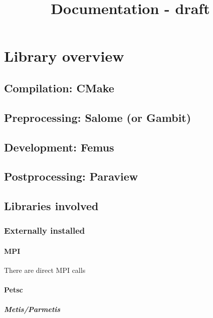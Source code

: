 \documentclass[10pt]{book}
\title{Documentation - draft}
\author{}
\date{}
\begin{document}
\maketitle

 \setcounter{tocdepth}{4}
\setcounter{secnumdepth}{4}
\tableofcontents 
{}


\part{Library overview}


 \chapter{Compilation: CMake}
 
 \chapter{Preprocessing: Salome (or Gambit)}
 
 \chapter{Development: Femus}
 
 \chapter{Postprocessing: Paraview}

 
 \chapter{Libraries involved}
 
 
 \section{Externally installed}
 
 \subsection{MPI}
    
     There are direct MPI calls
 
 \subsection{Petsc}

 \subsubsection{Metis/Parmetis}
 
\end{document}
